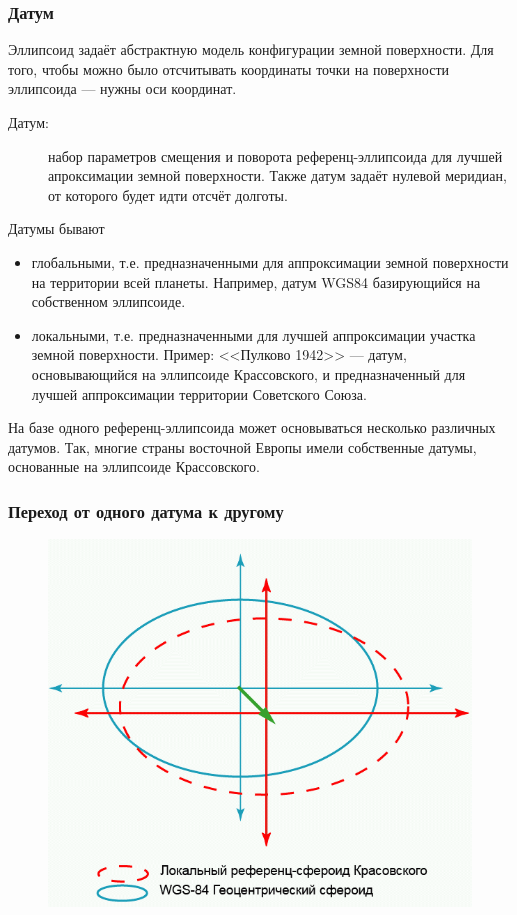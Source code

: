 \begin{frame}
    \frametitle{Датум}
    {\tiny Эллипсоид задаёт абстрактную модель конфигурации земной поверхности. Для того, чтобы можно было отсчитывать координаты точки на поверхности эллипсоида --- нужны оси координат.}

    \begin{description}
        \item[Датум:] набор параметров смещения и поворота референц-эллипсоида для лучшей апроксимации земной поверхности. Также датум задаёт нулевой меридиан, от которого будет идти отсчёт долготы.
    \end{description}
    { \small
   Датумы бывают
   \begin{itemize}
       \item глобальными, т.е. предназначенными для аппроксимации земной поверхности на территории всей планеты. Например, датум WGS84 базирующийся на собственном эллипсоиде.
       \item локальными, т.е. предназначенными для лучшей аппроксимации участка земной поверхности. Пример: <<Пулково 1942>> --- датум, основывающийся на эллипсоиде Крассовского, и предназначенный для лучшей аппроксимации территории Советского Союза.
    \end{itemize}
    }
   {\tiny На базе одного референц-эллипсоида может основываться несколько различных датумов. Так, многие страны восточной Европы имели собственные датумы, основанные на эллипсоиде Крассовского.}
\end{frame}


\begin{frame}
    \frametitle{Переход от одного датума к другому}
    \begin{figure}[!ht]
        \begin{center}
            \includegraphics[width=0.6\columnwidth]{./coordinates/img/coord_transition}
        \end{center}
    \end{figure}
\end{frame}


